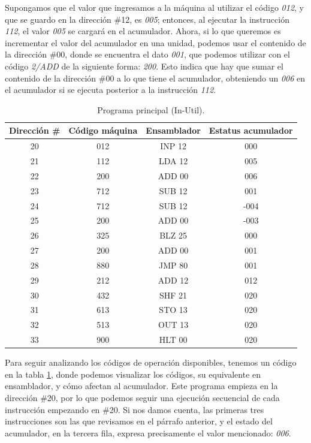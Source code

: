 \documentclass[letterpaper,12pt,oneside]{book}
\begin{document}
    Supongamos que el valor
	que ingresamos a la máquina al utilizar el código  \textit{012}, y que se guardo en la dirección
	\#12, es \textit{005}; entonces, al ejecutar la instrucción \textit{112}, el valor \textit{005} se cargará en el acumulador. Ahora, si lo que queremos es incrementar el valor
	del acumulador en una unidad, podemos usar el contenido de la dirección \#00, donde se encuentra el dato \textit{001},
	 que podemos utilizar con el código \textit{2/ADD} de la siguiente forma: \textit{200}. Esto indica que hay que sumar el contenido de la 
	dirección \#00 a lo que tiene
	el acumulador, obteniendo un \textit{006} en el acumulador si se ejecuta posterior a la instrucción  \textit{112}.
	
	\begin{table}[h]
	  \centering
	  \begin{tabular}{|c|c|c|c|}
	    \hline
    	\textbf{Dirección \#} & \textbf{Código máquina} & \textbf{Ensamblador} & \textbf{Estatus acumulador} \\
	    \hline
	     20 & 012 & INP 12 & 000 \\
	     21 & 112 & LDA 12 & 005\\
	     22 & 200 & ADD 00 & 006\\
	     23 & 712 & SUB 12 & 001\\
	     24 & 712 & SUB 12 & -004\\
	     25 & 200 & ADD 00 & -003\\
	     26 & 325 & BLZ 25 & 000\\
	     27 & 200 & ADD 00 & 001\\
	     28 & 880 & JMP 80 & 001\\
	     29 & 212 & ADD 12 & 012\\
	     30 & 432 & SHF 21 & 020\\
	     31 & 613 & STO 13 & 020\\
	     32 & 513 & OUT 13 & 020\\
	     33 & 900 & HLT 00 & 020\\
	    \hline
	  \end{tabular}
	  \caption{Programa principal (In-Util). }
	  \label{tab:Programa_Principal}
	\end{table}
	
	Para seguir analizando los códigos de operación disponibles, tenemos un código en la tabla \ref{tab:Programa_Principal}, donde
	podemos visualizar los códigos, su equivalente en ensamblador, y cómo afectan al acumulador. Este programa empieza en la
	dirección \#20, por lo que podemos seguir una ejecución secuencial de cada instrucción empezando en \#20.
	Si nos damos cuenta, las primeras tres instrucciones son las que revisamos en el párrafo anterior, y el
	estado del acumulador, en la tercera fila, expresa precisamente el valor mencionado: \textit{006}.
\end{document}
